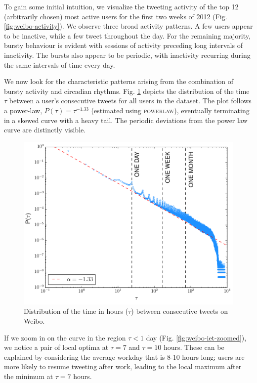 \documentclass[onesided,asymmetric]{tufte-book}
\begin{document}
To gain some initial intuition, we visualize the tweeting activity of the top 12 (arbitrarily chosen) most active users for the first two weeks of 2012 (Fig. \ref{fig:weibo-activity}). We observe three broad activity patterns. A few users appear to be inactive, while a few tweet throughout the day. For the remaining majority, bursty behaviour is evident with sessions of activity preceding long intervals of inactivity. The bursts also appear to be periodic, with inactivity recurring during the same intervals of time every day.

We now look for the characteristic patterns arising from the combination of bursty activity and circadian rhythms. Fig. \ref{fig:weibo-iet} depicts the distribution of the time $\tau$ between a user's consecutive tweets for all users in the dataset. The plot follows a power-law, $P(\tau) = \tau^{-1.33}$ (estimated using \textsc{powerlaw}\cite{alstott2014powerlaw}), eventually terminating in a skewed curve with a heavy tail. The periodic deviations from the power law curve are distinctly visible.

\vfill

\begin{figure}
  \includegraphics[width=\linewidth]{weibo_iet}
  \caption[Weibo intertweet time distribution.]{Distribution of the time in hours ($\tau$) between consecutive tweets on Weibo.}
  \label{fig:weibo-iet}
\end{figure}

\newpage

If we zoom in on the curve in the region $\tau < 1$ day (Fig. \ref{fig:weibo-iet-zoomed}), we notice a pair of local optima at $\tau = 7$ and $\tau = 10$ hours. These can be explained by considering the average workday that is 8-10 hours long; users are more likely to resume tweeting after work, leading to the local maximum after the minimum at $\tau = 7$ hours.
\end{document}
